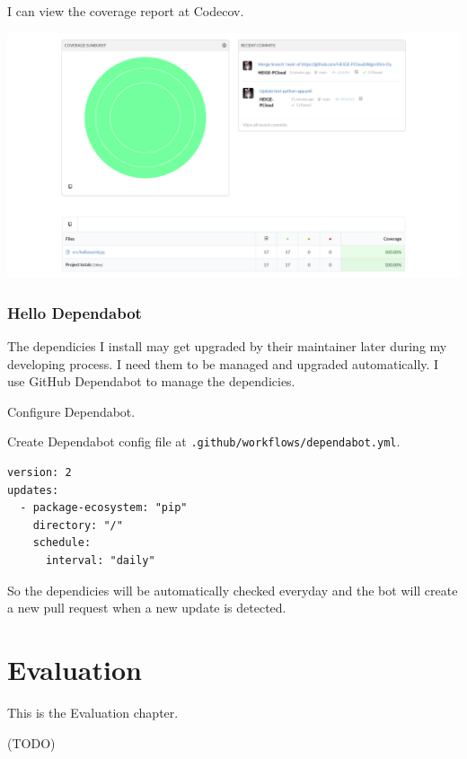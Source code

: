 \documentclass{report}
\begin{document}
I can view the coverage report at Codecov.

\includegraphics[width=\linewidth]{Codecov.png}

\subsection{Hello Dependabot}

The dependicies I install may get upgraded by their maintainer later during my developing process. I need them to be managed and upgraded automatically. I use GitHub Dependabot to manage the dependicies.

Configure Dependabot.

Create Dependabot config file at \texttt{.github/workflows/dependabot.yml}.

\begin{verbatim}
version: 2
updates:
  - package-ecosystem: "pip"
    directory: "/"
    schedule:
      interval: "daily"
\end{verbatim}

So the dependicies will be automatically checked everyday and the bot will create a new pull request when a new update is detected.

\chapter{Evaluation}

This is the Evaluation chapter.

(TODO)
\end{document}
